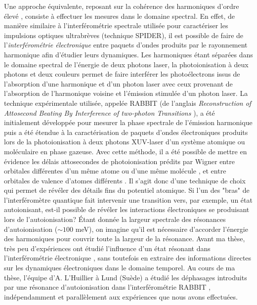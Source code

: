 Une approche équivalente, reposant sur la cohérence des harmoniques d'ordre élevé , consiste à effectuer les mesures dans le domaine spectral. En effet, de manière similaire à l'interférométrie spectrale utilisée pour caractériser les impulsions optiques ultrabrèves (technique SPIDER), il est possible de faire de l'\textit{interférométrie électronique} entre paquets d'ondes produits par le rayonnement harmonique afin d'étudier leurs dynamiques. Les harmoniques étant séparées dans le domaine spectral de l'énergie de deux photons laser, la photoionisation à deux photons et deux couleurs permet de faire interférer les photoélectrons issus de l'absorption d'une harmonique et d'un photon laser avec ceux provenant de  l'absorption de l'harmonique voisine et l'émission stimulée d'un photon laser. La technique expérimentale utilisée, appelée RABBIT (de l'anglais \textit{Reconstruction of Attosecond Beating By Interference of two-photon Transitions} ), a été initialement développée pour mesurer la phase spectrale de l'émission harmonique  puis a été étendue à la caractérisation de paquets d'ondes électroniques produits lors de la photoionisation à deux photons XUV-laser d'un système atomique ou moléculaire en phase gazeuse. Avec cette méthode, il a été possible de mettre en évidence les délais attosecondes de photoionisation prédits par Wigner entre orbitales différentes d'un même atome  ou d'une même molécule , et entre orbitales de valence d'atomes différents . Il s'agit donc d'une technique de choix qui permet de révéler des détails fins du potentiel atomique. Si l'un des "bras" de l'interféromètre quantique fait intervenir une transition vers, par exemple, un état autoionisant, est-il possible de révéler les interactions électroniques se produisant lors de l'autoionisation? \'{E}tant donnée la largeur spectrale des résonances d'autoionisation ($\sim 100$ meV), on imagine qu'il est nécessaire d'accorder l'énergie des harmoniques pour couvrir toute la largeur de la résonance. Avant ma thèse, très peu d'expériences ont étudié l'influence d'un état résonant dans l'interférométrie électronique , sans toutefois en extraire des informations directes sur les dynamiques électroniques dans le domaine temporel. Au cours de ma thèse, l'équipe d'A. L'Huillier à Lund (Suède) a étudié les déphasages introduits par une résonance d'autoionisation dans l'interférométrie RABBIT , indépendamment et parallèlement aux expériences que nous avons effectuées.

